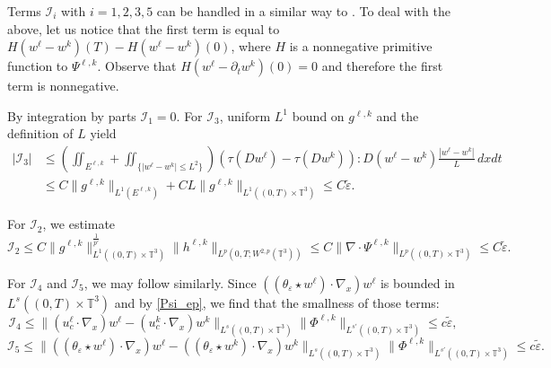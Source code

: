 \documentclass[10pt,reqno]{amsart}
\numberwithin{equation}{section}
\newcommand{\T}{\mathbb T}
\newcommand{\e}{\varepsilon}
\newcommand{\te}{\tilde\varepsilon}
\newcommand{\lt}{\left}
\newcommand{\rt}{\right}
\newcommand{\pa}{\partial}
\begin{document}
Terms $\mathcal{I}_i$ with $i=1,2,3,5$ can be handled in a similar way to \cite{FMS97}. 
To deal with the above, let us notice that the first term is equal to $H(w^\ell -  w^k)(T) - H(w^\ell -  w^k)(0)$, where $H$ is a nonnegative primitive function to $\Psi^{\ell,k}$. Observe that $H(w^\ell - \pa_t w^k)(0)=0$ and therefore the first term is nonnegative.

By integration by parts $\mathcal{I}_1= 0.$  For $\mathcal{I}_3$, uniform $L^1$ bound on $g^{\ell,k}$ and the definition of $L$ yield 
\[\begin{aligned}
|\mathcal{I}_3| &\leq \lt(\iint_{E^{\ell,k}}+ \iint_{\{|w^\ell - w^k|\le L^2\}}\rt) (\tau(Dw^\ell) - \tau(Dw^k)): D(w^\ell - w^k) \frac{|w^\ell - w^k|}{L}\,dxdt\\
&\le C\|g^{\ell,k}\|_{L^1(E^{\ell,k})} + CL\|g^{\ell,k}\|_{L^1((0,T)\times\T^3)}\le C\tilde \e.
\end{aligned}\]

For $\mathcal{I}_2$, we estimate
\[
\mathcal{I}_2 \le C\|g^{\ell,k}\|_{L^1((0,T)\times\T^3)}^{\frac{1}{p'}}\|h^{\ell,k}\|_{L^p(0,T;W^{2,p}(\T^3))}\le C\|\nabla\cdot\Psi^{\ell,k}\|_{L^p((0,T)\times\T^3)}\le C\tilde \e.
\]

For $\mathcal{I}_4$ and $\mathcal{I}_5$, we may follow similarly. Since $((\theta_\e \star w^\ell)\cdot \nabla_x) w^\ell$ is bounded in $L^s((0,T)\times\T^3)$ and by \eqref{Psi_ep}, we find that the smallness of those terms:
\[
\mathcal{I}_4 \le \|(u_c^\ell \cdot \nabla_x) w^\ell - ( u_c^k \cdot \nabla_x ) w^k\|_{L^{s}((0,T)\times\T^3)}\|\Phi^{\ell,k}\|_{L^{s'}((0,T)\times\T^3)} \le c \te,
\]
\[
\mathcal{I}_5 \le \|((\theta_\e \star w^\ell) \cdot \nabla_x) w^\ell - ( (\theta_\e \star w^k) \cdot \nabla_x ) w^k\|_{L^{s}((0,T)\times\T^3)}\|\Phi^{\ell,k}\|_{L^{s'}((0,T)\times\T^3)}
\le c \te.
\]
\end{document}

